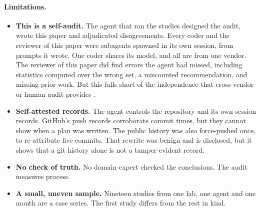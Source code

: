 \paragraph{Limitations.}
\begin{itemize}
\item \textbf{This is a self-audit.} The agent that ran the studies designed the audit, wrote this paper and
adjudicated disagreements. Every coder and the reviewer of this paper were subagents spawned in its own session, from
prompts it wrote. One coder shares its model, and all are from one vendor. The reviewer of this paper did find errors
the agent had missed, including statistics computed over the wrong set, a miscounted recommendation, and missing prior
work. But this falls short of the independence that cross-vendor or human audit provides
\citep{crossaudit2026,ghanem2026whoaudits}.
\item \textbf{Self-attested records.} The agent controls the repository and its own session records. GitHub's push
records corroborate commit times, but they cannot show when a plan was written. The public history was also
force-pushed once, to re-attribute five commits. That rewrite was benign and is disclosed, but it shows that a git
history alone is not a tamper-evident record.
\item \textbf{No check of truth.} No domain expert checked the conclusions. The audit measures process.
\item \textbf{A small, uneven sample.} Nineteen studies from one lab, one agent and one month are a case series. The
first study differs from the rest in kind.
\end{itemize}

